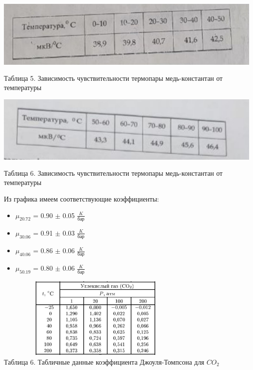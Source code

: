 \documentclass[a4paper, 12pt]{article}
\begin{document}
	\begin{center}
		\includegraphics[width=15cm, height=4cm]{"Screenshot_1.jpg"}\\
		Таблица 5. Зависимость чувствительности термопары медь-константан от температуры
		\includegraphics[width=15cm, height=4cm]{"Screenshot_2.jpg"}
		Таблица 6. Зависимость чувствительности термопары медь-константан от температуры
	\end{center}
	
	Из графика имеем соответствующие коэффициенты:
	\begin{itemize}
		\item $\mu_{20.72}$ = 0.90 $\pm$ 0.05 $\frac{K}{\text{бар}}$
		\item $\mu_{30.06}$ = 0.91 $\pm$ 0.03 $\frac{K}{\text{бар}}$ 
		\item $\mu_{40.06}$ = 0.86 $\pm$ 0.06 $\frac{K}{\text{бар}}$
		\item $\mu_{50.19}$ = 0.80 $\pm$ 0.06 $\frac{K}{\text{бар}}$
	\end{itemize}

	\begin{center}
	\includegraphics[width=10cm, height=4cm]{"Screenshot_3.jpg"}\\
	Таблица 6. Табличные данные коэффициента Джоуля-Томпсона для $CO_2$
	\end{center}
\end{document}
